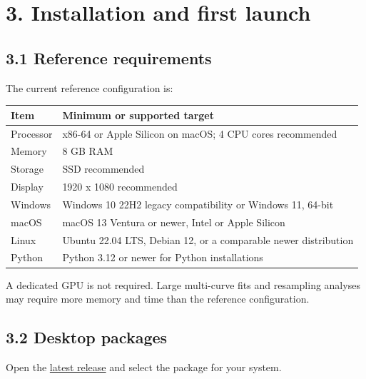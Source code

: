 \documentclass[
  10pt,
  a4paper,
  oneside]{scrreprt}
\begin{document}
\hypertarget{installation-and-first-launch}{%
\chapter{3. Installation and first
launch}\label{installation-and-first-launch}}

\hypertarget{reference-requirements}{%
\section{3.1 Reference requirements}\label{reference-requirements}}

The current reference configuration is:

\begin{longtable}[]{@{}ll@{}}
\toprule
Item & Minimum or supported target\tabularnewline
\midrule
\endhead
Processor & x86-64 or Apple Silicon on macOS; 4 CPU cores
recommended\tabularnewline
Memory & 8 GB RAM\tabularnewline
Storage & SSD recommended\tabularnewline
Display & 1920 x 1080 recommended\tabularnewline
Windows & Windows 10 22H2 legacy compatibility or Windows 11,
64-bit\tabularnewline
macOS & macOS 13 Ventura or newer, Intel or Apple Silicon\tabularnewline
Linux & Ubuntu 22.04 LTS, Debian 12, or a comparable newer
distribution\tabularnewline
Python & Python 3.12 or newer for Python installations\tabularnewline
\bottomrule
\end{longtable}

A dedicated GPU is not required. Large multi-curve fits and resampling
analyses may require more memory and time than the reference
configuration.

\hypertarget{desktop-packages}{%
\section{3.2 Desktop packages}\label{desktop-packages}}

Open the
\href{https://github.com/SebRoLENS/curvemole/releases/latest}{latest
release} and select the package for your system.
\end{document}
